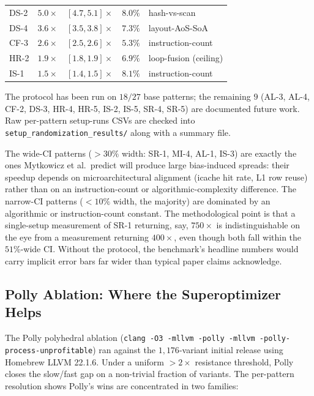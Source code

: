 \begin{center}
\begin{tabular}{lrlrl}
DS-2 & $5.0\times$        & $[4.7, 5.1]\times$            & $8.0\%$  & hash-vs-scan \\
DS-4 & $3.6\times$        & $[3.5, 3.8]\times$            & $7.3\%$  & layout-AoS-SoA \\
CF-3 & $2.6\times$        & $[2.5, 2.6]\times$            & $5.3\%$  & instruction-count \\
HR-2 & $1.9\times$        & $[1.8, 1.9]\times$            & $6.9\%$  & loop-fusion (ceiling) \\
IS-1 & $1.5\times$        & $[1.4, 1.5]\times$            & $8.1\%$  & instruction-count \\
\bottomrule
\end{tabular}
\end{center}

The protocol has been run on $18/27$ base patterns; the remaining $9$ (AL-3, AL-4, CF-2, DS-3, HR-4, HR-5, IS-2, IS-5, SR-4, SR-5) are documented future work. Raw per-pattern setup-runs CSVs are checked into \texttt{setup\_randomization\_results/} along with a summary file.

The wide-CI patterns ($> 30\%$ width: SR-1, MI-4, AL-1, IS-3) are exactly the ones Mytkowicz et al.\ predict will produce large bias-induced spreads: their speedup depends on microarchitectural alignment (icache hit rate, L1 row reuse) rather than on an instruction-count or algorithmic-complexity difference. The narrow-CI patterns ($< 10\%$ width, the majority) are dominated by an algorithmic or instruction-count constant. The methodological point is that a single-setup measurement of SR-1 returning, say, $750\times$ is indistinguishable on the eye from a measurement returning $400\times$, even though both fall within the $51\%$-wide CI. Without the protocol, the benchmark's headline numbers would carry implicit error bars far wider than typical paper claims acknowledge.

\subsection{Polly Ablation: Where the Superoptimizer Helps}\label{subsec:results-polly}

The Polly polyhedral ablation (\texttt{clang -O3 -mllvm -polly -mllvm -polly-process-unprofitable}) ran against the $1{,}176$-variant initial release using Homebrew LLVM 22.1.6. Under a uniform $> 2\times$ resistance threshold, Polly closes the slow/fast gap on a non-trivial fraction of variants. The per-pattern resolution shows Polly's wins are concentrated in two families:

